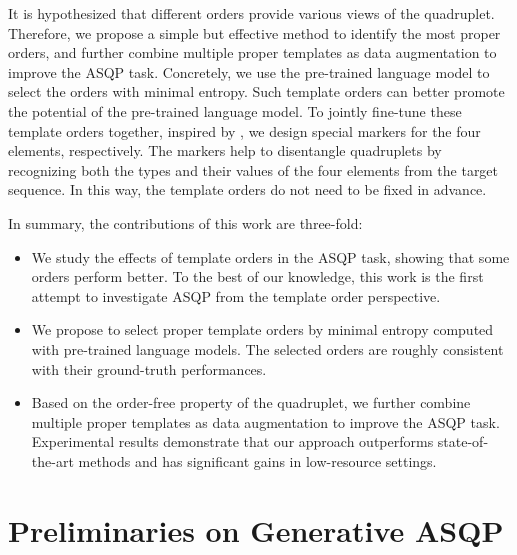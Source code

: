 \documentclass[11pt]{article}
\begin{document}
It is hypothesized that different orders provide various views of the quadruplet. Therefore, we propose a simple but effective method to identify the most proper orders, and further combine multiple proper templates as data augmentation to improve the ASQP task. Concretely, we use the pre-trained language model \cite{JMLR:v21:20-074} to select the orders with minimal entropy. Such template orders can better promote the potential of the pre-trained language model. To jointly fine-tune these template orders together, inspired by \citet{paolini2021structured}, we design special markers for the four elements, respectively. The markers help to disentangle quadruplets by recognizing both the types and their values of the four elements from the target sequence. In this way, the template orders do not need to be fixed in advance.















In summary, the contributions of this work are three-fold:
\begin{itemize}
    \item We study the effects of template orders in the ASQP task, showing that some orders perform better. To the best of our knowledge, this work is the first attempt to investigate ASQP from the template order perspective.
    \item We propose to select proper template orders by minimal entropy computed with pre-trained language models. The selected orders are roughly consistent with their ground-truth performances. 
    \item Based on the order-free property of the quadruplet, we further combine multiple proper templates as data augmentation to improve the ASQP task. Experimental results demonstrate that our approach outperforms state-of-the-art methods and has significant gains in low-resource settings.
\end{itemize}






\section{Preliminaries on Generative ASQP}
\label{sec:paraphrase}
\end{document}
